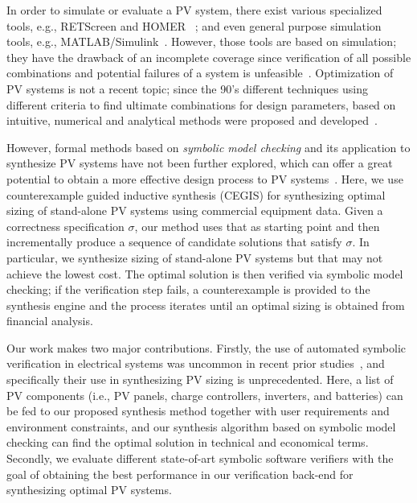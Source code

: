 \documentclass[10pt,conference]{IEEEtran}
\begin{document}
In order to simulate or evaluate a PV system, there exist various specialized tools, e.g., RETScreen and HOMER~\cite{Pradhan,Swarnkar}%
; and even general purpose simulation tools, e.g., MATLAB/Simulink~\cite{Gow1999}. %
 However, those tools are based on simulation; they have the drawback of an incomplete coverage  since verification of all possible combinations and potential failures of a system is unfeasible~\cite{ClarkeHV18}. 
 Optimization of PV systems is not a recent topic; since the 90's different techniques using different criteria to find ultimate combinations for design parameters, based on intuitive, numerical and analytical methods were proposed and developed~\cite{Alsadi2018}.
 
However, formal methods based on \textit{symbolic model checking} and its application to synthesize PV systems have not been further explored, which can offer a great potential to obtain a more effective design process to PV systems~\cite{ClarkeHV18}. Here, we use counterexample guided inductive synthesis (CEGIS) for synthesizing optimal sizing of stand-alone PV systems using commercial equipment data. Given a correctness specification $\sigma$, our method uses that as starting point and then incrementally produce a sequence of candidate solutions that satisfy $\sigma$. In particular, we synthesize sizing of stand-alone PV systems but that may not achieve the lowest cost. The optimal solution is then verified via symbolic model checking; if the verification step fails, a counterexample is provided to the synthesis engine and the process iterates until an optimal sizing is obtained from financial analysis.

Our work makes two major contributions. Firstly, the use of automated symbolic verification in electrical systems was uncommon in recent prior studies~\cite{abs-1811-09438}, and specifically their use in synthesizing PV sizing is unprecedented. Here, a list of PV components (i.e., PV panels, charge controllers, inverters, and batteries) can be fed to our proposed synthesis method together with user requirements and environment constraints, and our synthesis algorithm based on symbolic model checking can find the optimal solution in technical and economical terms. Secondly, we evaluate different state-of-art symbolic software verifiers with the goal of obtaining the best performance in our verification back-end for synthesizing optimal PV systems.
%
\end{document}

